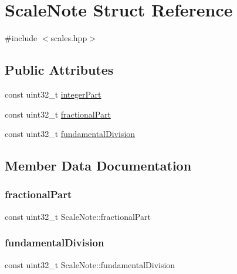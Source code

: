 \hypertarget{struct_scale_note}{}\section{Scale\+Note Struct Reference}
\label{struct_scale_note}


{\ttfamily \#include $<$scales.\+hpp$>$}

\subsection*{Public Attributes}
\begin{DoxyCompactItemize}
\item 
const uint32\+\_\+t \mbox{\hyperlink{struct_scale_note_aebbc5374b38420c4be5bd2ab0892d2c9}{integer\+Part}}
\item 
const uint32\+\_\+t \mbox{\hyperlink{struct_scale_note_aad0ee612e235396e439e616203ad5827}{fractional\+Part}}
\item 
const uint32\+\_\+t \mbox{\hyperlink{struct_scale_note_afe9f0f893cf7c2602f7fad04c4a1bdf6}{fundamental\+Division}}
\end{DoxyCompactItemize}


\subsection{Member Data Documentation}
\mbox{\label{struct_scale_note_aad0ee612e235396e439e616203ad5827}} 
\subsubsection{\texorpdfstring{fractional\+Part}{fractionalPart}}
{\footnotesize\ttfamily const uint32\+\_\+t Scale\+Note\+::fractional\+Part}

\mbox{\label{struct_scale_note_afe9f0f893cf7c2602f7fad04c4a1bdf6}} 
\subsubsection{\texorpdfstring{fundamental\+Division}{fundamentalDivision}}
{\footnotesize\ttfamily const uint32\+\_\+t Scale\+Note\+::fundamental\+Division}

